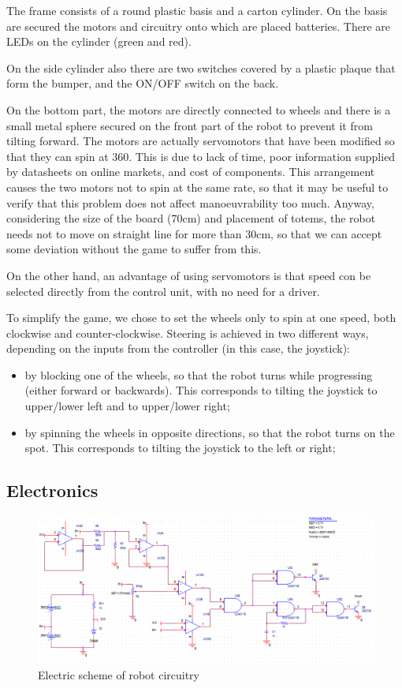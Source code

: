 \documentclass[a4paper,twoside]{book}
\begin{document}
The frame consists of a round plastic basis and a carton cylinder. On the basis are secured the motors and circuitry onto which are placed batteries. There are LEDs on the cylinder (green and red).

On the side cylinder also there are two switches covered by a plastic plaque that form the bumper, and the ON/OFF switch on the back.

On the bottom part, the motors are directly connected to wheels and there is a small metal sphere secured on the front part of the robot to prevent it from tilting forward. The motors are actually servomotors that have been modified so that they can spin at 360\degree. This is due to lack of time, poor information supplied by data\textendash sheets on online markets, and cost of components. This arrangement causes the two motors not to spin at the same rate, so that it may be useful to verify that this problem does not affect manoeuvrability too much. Anyway, considering the size of the board (70cm) and placement of totems, the robot needs not to move on straight line for more than 30cm, so that we can accept some deviation without the game to suffer from this.

On the other hand, an advantage of using servomotors is that speed con be selected directly from the control unit, with no need for a driver.

To simplify the game, we chose to set the wheels only to spin at one speed, both clockwise and counter-clockwise. Steering is achieved in two different ways, depending on the inputs from the controller (in this case, the joystick):
\begin{itemize}
\item by blocking one of the wheels, so that the robot turns while progressing (either forward or backwards). This corresponds to tilting the joystick to upper/lower left and to upper/lower right;
\item by spinning the wheels in opposite directions, so that the robot turns on the spot. This corresponds to tilting the joystick to the left or right;
\end{itemize}

\subsection{Electronics}

\begin{figure}[h]
\includegraphics[width=\textwidth]{img/ProgettoCircuito.eps}
\caption{Electric scheme of robot circuitry}
\label{fig:robot_circ}
\end{figure}
\end{document}
